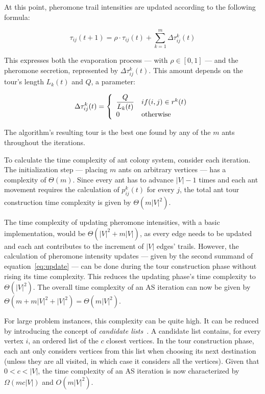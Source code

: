 At this point, pheromone trail intensities are updated according to the
following formula:

\begin{equation}
  \tau_{ij}(t+1) = \rho \cdot \tau_{ij}(t) + \sum_{k=1}^m\Delta\tau^k_{ij}(t)
  \label{eq:update}
\end{equation}

This expresses both the evaporation process --- with $\rho \in [0, 1]$ --- and
the pheromone secretion, represented by $\Delta\tau^k_{ij}(t)$. This amount
depends on the tour's length $L_k(t)$ and $Q$, a parameter:

\begin{equation}
  \Delta\tau^k_{ij}(t) = \left\{
    \begin{array}{l l}
      \dfrac{Q}{L_k(t)} & if (i,j) \in r^k(t) \\
      0 & \mbox{otherwise}
    \end{array}
    \right.
  \label{eq:trail}
\end{equation}

The algorithm's resulting tour is the best one found by any of the $m$ ants
throughout the iterations.

To calculate the time complexity of ant colony system, consider each iteration.
The initialization step --- placing $m$ ants on arbitrary vertices --- has a
complexity of $\Theta(m)$. Since every ant has to advance $|V|-1$ times and
each ant movement requires the calculation of $p^k_{ij}(t)$ for every $j$,
the total ant tour construction time complexity is given by $\Theta(m|V|^2)$.

The time complexity of updating pheromone intensities, with a basic
implementation, would be $\Theta(|V|^2 + m|V|)$, as every edge needs to be
updated and each ant contributes to the increment of $|V|$ edges' trails.
However, the calculation of pheromone intensity updates --- given by the second
summand of equation~\ref{eq:update} --- can be done during the tour
construction phase without rising its time complexity. This reduces the
updating phase's time complexity to $\Theta(|V|^2)$. The overall time
complexity of an AS iteration can now be given by $\Theta(m + m|V|^2 + |V|^2) =
\Theta(m|V|^2)$.

For large problem instances, this complexity can be quite high. It can be
reduced by introducing the concept of \textit{candidate
lists}~\cite{Dorigo1996aco}. A candidate list contains, for every vertex $i$,
an ordered list of the $c$ closest vertices. In the tour construction phase,
each ant only considers vertices from this list when choosing its next
destination (unless they are all visited, in which case it considers all the
vertices). Given that $0 < c < |V|$, the time complexity of an AS iteration is
now characterized by $\Omega(mc|V|)$ and $O(m|V|^2)$.


